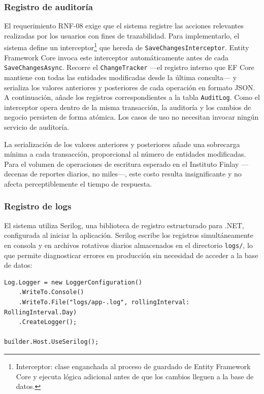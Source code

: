 \subsubsection{Registro de auditoría}

El requerimiento RNF-08 exige que el sistema registre las acciones relevantes realizadas por los usuarios con fines de trazabilidad. 
Para implementarlo, el sistema define un interceptor\footnote{Interceptor: clase enganchada al proceso de guardado de Entity Framework Core y ejecuta lógica adicional antes de que los cambios lleguen a la base de datos.} que hereda de \texttt{SaveChangesInterceptor}. 
Entity Framework Core invoca este interceptor automáticamente antes de cada \texttt{SaveChangesAsync}.
Recorre el \texttt{ChangeTracker} —el registro interno que EF Core mantiene con todas las entidades modificadas desde la última consulta— y serializa los valores anteriores y posteriores de cada operación en formato JSON. 
A continuación, añade los registros correspondientes a la tabla \texttt{AuditLog}.
Como el interceptor opera dentro de la misma transacción, la auditoría y los cambios de negocio persisten de forma atómica. 
Los casos de uso no necesitan invocar ningún servicio de auditoría.

La serialización de los valores anteriores y posteriores añade una sobrecarga mínima a cada transacción, proporcional al número de entidades modificadas. 
Para el volumen de operaciones de escritura esperado en el Instituto Finlay —decenas de reportes diarios, no miles—, este costo resulta insignificante y no afecta perceptiblemente el tiempo de respuesta.


\subsubsection{Registro de logs}

El sistema utiliza Serilog, una biblioteca de registro estructurado para .NET, configurada al iniciar la aplicación. 
Serilog escribe los registros simultáneamente en consola y en archivos rotativos diarios almacenados en el directorio \texttt{logs/}, lo que permite diagnosticar errores en producción sin necesidad de acceder a la base de datos:

\begin{lstlisting}[language={[Sharp]C}, caption={Configuración de Serilog en Program.cs}, label={lst:serilog}]
Log.Logger = new LoggerConfiguration()
    .WriteTo.Console()
    .WriteTo.File("logs/app-.log", rollingInterval: RollingInterval.Day)
    .CreateLogger();

builder.Host.UseSerilog();
\end{lstlisting}

